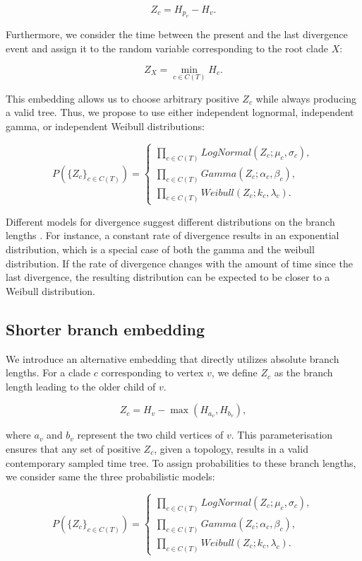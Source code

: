 \documentclass[10pt,letterpaper]{article}
\begin{document}
$$
Z_c = H_{p_v} - H_v.
$$

Furthermore, we consider the time between the present and the last divergence event and assign it to the random variable corresponding to the root clade $X$:

$$
Z_X = \min_{c \in C(T)}{H_c}.
$$

This embedding allows us to choose arbitrary positive $Z_c$ while always producing a valid tree. Thus, we propose to use either independent lognormal, independent gamma, or independent Weibull distributions:

$$
P(\{Z_c\}_{c \in C(T)}) = \begin{cases}
	\prod_{c \in C(T)}{LogNormal(Z_c; \mu_c, \sigma_c)}, \\
	\prod_{c \in C(T)}{Gamma(Z_c; \alpha_c, \beta_c)}, \\
	\prod_{c \in C(T)}{Weibull(Z_c; k_c, \lambda_c)}.
	\end{cases}
$$

Different models for divergence suggest different distributions on the branch lengths \cite{venditti2010phylogenies}. For instance, a constant rate of divergence results in an exponential distribution, which is a special case of both the gamma and the weibull distribution. If the rate of divergence changes with the amount of time since the last divergence, the resulting distribution can be expected to be closer to a Weibull distribution.

\subsection*{Shorter branch embedding}

We introduce an alternative embedding that directly utilizes absolute branch lengths. For a clade $c$ corresponding to vertex $v$, we define $Z_c$ as the branch length leading to the older child of $v$.

$$
Z_c = H_v - \max{\left(H_{a_v}, H_{b_v}\right)},
$$

where $a_v$ and $b_v$ represent the two child vertices of $v$. This parameterisation ensures that any set of positive $Z_c$, given a topology, results in a valid contemporary sampled time tree. To assign probabilities to these branch lengths, we consider same the three probabilistic models:

$$
P(\{Z_c\}_{c \in C(T)}) = \begin{cases}
	\prod_{c \in C(T)}{LogNormal(Z_c; \mu_c, \sigma_c)}, \\
	\prod_{c \in C(T)}{Gamma(Z_c; \alpha_c, \beta_c)}, \\
	\prod_{c \in C(T)}{Weibull(Z_c; k_c, \lambda_c)}.
\end{cases}
$$
\end{document}
